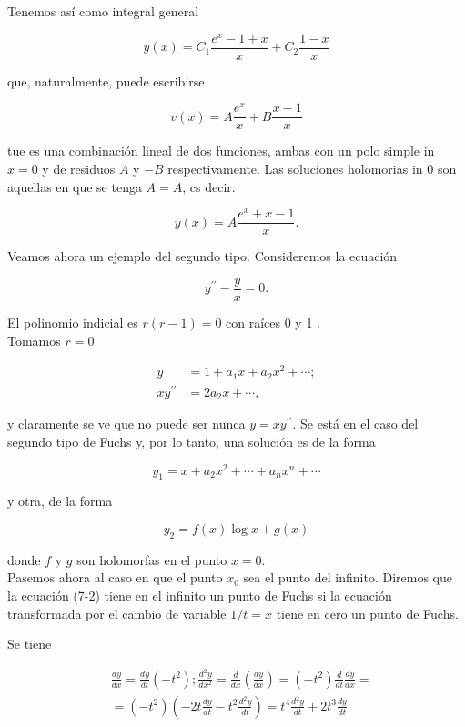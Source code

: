 \documentclass[10pt]{article}
\theoremstyle{plain}
\theoremstyle{definition}
\theoremstyle{remark}
\begin{document}
Tenemos así como integral general

$$
y(x)=C_{1} \frac{e^{x}-1+x}{x}+C_{2} \frac{1-x}{x}
$$

que, naturalmente, puede escribirse

$$
v(x)=A \frac{e^{x}}{x}+B \frac{x-1}{x}
$$

tue es una combinación lineal de dos funciones, ambas con un polo simple in $x=0$ y de residuos $A$ y $-B$ respectivamente. Las soluciones holomorias in 0 son aquellas en que se tenga $A=A$, cs decir:

$$
y(x)=A \frac{e^{x}+x-1}{x} .
$$

Veamos ahora un ejemplo del segundo tipo. Consideremos la ecuación

$$
y^{\prime \prime}-\frac{y}{x}=0 .
$$

El polinomio indicial es $r(r-1)=0$ con raíces 0 y 1 .\\
Tomamos $r=0$

$$
\begin{aligned}
y & =1+a_{1} x+a_{2} x^{2}+\cdots ; \\
x y^{\prime \prime} & =2 a_{2} x+\cdots,
\end{aligned}
$$

y claramente se ve que no puede ser nunca $y=x y^{\prime \prime}$. Se está en el caso del segundo tipo de Fuchs y, por lo tanto, una solución es de la forma

$$
y_{1}=x+a_{2} x^{2}+\cdots+a_{n} x^{n}+\cdots
$$

y otra, de la forma

$$
y_{2}=f(x) \log x+g(x)
$$

donde $f$ y $g$ son holomorfas en el punto $x=0$.\\
Pasemos ahora al caso en que el punto $x_{0}$ sea el punto del infinito. Diremos que la ecuación (7-2) tiene en el infinito un punto de Fuchs si la ecuación transformada por el cambio de variable $1 / t=x$ tiene en cero un punto de Fuchs.

Se tiene

$$
\begin{aligned}
& \frac{d y}{d x}=\frac{d y}{d t}\left(-t^{2}\right) ; \frac{d^{2} y}{d x^{2}}=\frac{d}{d x}\left(\frac{d y}{d x}\right)=\left(-t^{2}\right) \frac{d}{d t} \frac{d y}{d x}= \\
& =\left(-t^{2}\right)\left(-2 t \frac{d y}{d t}-t^{2} \frac{d^{2} y}{d t}\right)=t^{4} \frac{d^{2} y}{d t}+2 t^{3} \frac{d y}{d t}
\end{aligned}
$$
\end{document}
